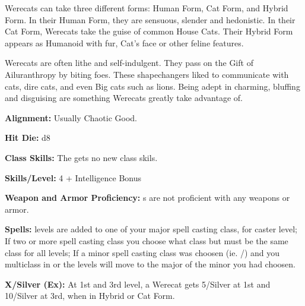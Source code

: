 
Werecats can take three different forms: Human Form, Cat Form, and Hybrid Form. In their Human Form, they are sensuous, slender and hedonistic. In their Cat Form, Werecats take the guise of common House Cats. Their Hybrid Form appears as Humanoid with fur, Cat's face or other feline features.

Werecats are often lithe and self-indulgent. They pass on the Gift of Ailuranthropy by biting foes. These shapechangers liked to communicate with cats, dire cats, and even Big cats such as lions. Being adept in charming, bluffing and disguising are something Werecats greatly take advantage of.

\textbf{Alignment:} Usually Chaotic Good.

\textbf{Hit Die:} d8

\textbf{Class Skills:} The \currentclassname{} gets no new class skils.

\textbf{Skills/Level:} 4 + Intelligence Bonus

\modebab{}
\poorfor{}
\goodref{}
\poorwil{}

\begin{classtable}
\end{classtable}

\classfeatures

\textbf{Weapon and Armor Proficiency:} \currentclassname{}s are not proficient with any weapons or armor.

\textbf{Spells:} \currentclassname{} levels are added to one of your major spell casting class, for caster level; If two or more spell casting class you choose what class but must be the same class for all \currentclassname{} levels; If a minor spell casting class was choosen (ie. /) and you multiclass in  or  the \currentclassname{} levels will move to the major of the minor you had choosen.

\textbf{ X/Silver (Ex):} At 1st and 3rd level, a Werecat gets  5/Silver at 1st and 10/Silver at 3rd, when in Hybrid or Cat Form.

